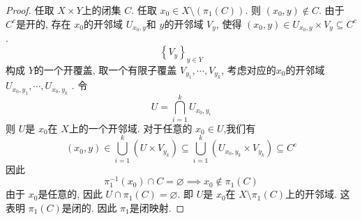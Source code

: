 \documentclass[../main.tex]{subfiles}
\begin{document}
\begin{proof}
   任取 \(  X\times Y  \)上的闭集 \(  C  \).  任取 \(  x_0 \in X\setminus \left(  \pi _1 \left( C \right)  \right)   \). 则 \(  \left( x_0,y \right)\not \in C   \). 由于 \(  C^{c}  \)是开的, 存在 \(  x_0  \)的开邻域 \(  U_{x_0,y}  \)和 \(  y  \)的开邻域 \(  V_{y}  \), 使得 \(  \left( x_0,y \right)\in U_{x_0,y}\times V_{y}  \subseteq C^{c}\)          . \[
   \left\{  V_{y} \right\}_{y \in Y}
   \]构成 \(  Y  \)的一个开覆盖, 取一个有限子覆盖 \(V_{y_1},\cdots ,V_{y_{k}} \), 考虑对应的\(  x_0  \)的开邻域 \(  U_{x_0,y_1},\cdots ,U_{x_0,y_{k}}  \)  .  令 \[
   U= \bigcap _{i= 1}^{k}U_{x_0,y_{i}}
   \]则 \(  U  \)是 \(  x_0  \)在 \(  X  \)上的一个开邻域. 对于任意的 \(  x_0 \in U  \),我们有 \[
    \left( x_0,y \right)\in \bigcup _{i = 1}^{k}\left( U\times V_{y_{k}} \right)\subseteq \bigcup _{i = 1}^{k}\left( U_{x_0,y_{k}}\times V_{y_{k}} \right)\subseteq C^{c} 
   \] 因此 \[
    \pi_1 ^{-1} \left( x_0 \right)\cap C= \varnothing\implies x_0\not \in  \pi _1 \left( C \right) 
   \]由于 \(  x_0  \)是任意的, 因此 \(  U\cap  \pi _1 \left( C \right)= \varnothing   \). 即 \(  U  \)是 \(  x_0  \)在 \(  X\setminus  \pi _1 \left( C \right)   \)上的开邻域. 这表明 \(   \pi _1 \left( C \right)   \)是闭的. 因此 \(   \pi _1   \)是闭映射.       
\end{proof}
\end{document}
